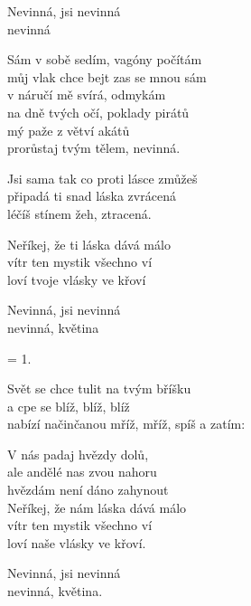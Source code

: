 
\vspace{-2 pt}

\re{}
Nevinná, jsi nevinná\\
nevinná 

\vspace{-3 pt}

\ve{}
Sám v sobě sedím, vagóny počítám\\
můj vlak chce bejt zas se mnou sám\\
v náručí mě svírá, odmykám\\
na dně tvých očí, poklady pirátů\\
mý paže z větví akátů\\
prorůstaj tvým tělem, nevinná.

\vspace{-3 pt}

\cho{} 
Jsi sama tak co proti lásce zmůžeš\\
připadá ti snad láska zvrácená\\
léčíš stínem žeh, ztracená.

\vspace{-2 pt}

Neříkej, že ti láska dává málo\\
vítr ten mystik všechno ví\\
loví tvoje vlásky ve křoví 

\vspace{-3 pt}

\re{}
Nevinná, jsi nevinná\\
nevinná, květina 

\vspace{-3 pt}

\ve{}
= 1.

\vspace{-3 pt}

\cho{}

\vspace{-5 pt}

\re{*:}
Svět se chce tulit na tvým bříšku\\
a cpe se blíž, blíž, blíž\\
nabízí načinčanou mříž, mříž, spíš a zatím: 

\vspace{-5 pt}

\cho{}
V nás padaj hvězdy dolů,\\
ale andělé nas zvou nahoru\\
hvězdám není dáno zahynout\\
Neříkej, že nám láska dává málo\\
vítr ten mystik všechno ví\\
loví naše vlásky ve křoví.

\vspace{-5 pt}

\re{}
Nevinná, jsi nevinná\\
nevinná, květina.

\esong